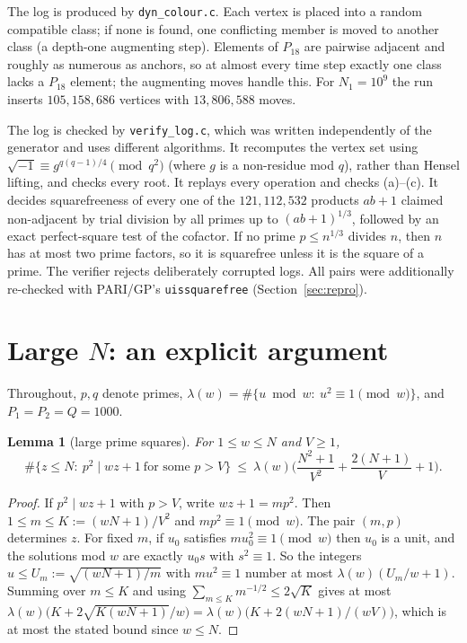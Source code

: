 \documentclass[11pt]{amsart}
\newtheorem{lemma}[theorem]{Lemma}
\theoremstyle{definition}
\theoremstyle{remark}
\begin{document}
The log is produced by \texttt{dyn\_colour.c}. Each vertex is placed into a random compatible class; if none
is found, one conflicting member is moved to another class (a depth-one augmenting step). Elements of $P_{18}$
are pairwise adjacent and roughly as numerous as anchors, so at almost every time step exactly one class
lacks a $P_{18}$ element; the augmenting moves handle this. For $N_1=10^9$ the run inserts $105{,}158{,}686$
vertices with $13{,}806{,}588$ moves.

The log is checked by \texttt{verify\_log.c}, which was written independently of the generator and uses
different algorithms. It recomputes the vertex set using $\sqrt{-1}\equiv g^{q(q-1)/4}\pmod{q^2}$ (where $g$ is
a non-residue mod $q$), rather than Hensel lifting, and checks every root. It replays every operation and
checks (a)--(c). It decides squarefreeness of every one of the $121{,}112{,}532$ products $ab+1$ claimed
non-adjacent by trial division by all primes up to $(ab+1)^{1/3}$, followed by an exact perfect-square test
of the cofactor. If no prime $p\le n^{1/3}$ divides $n$, then $n$ has at most two prime factors, so it is
squarefree unless it is the square of a prime. The verifier rejects deliberately corrupted logs. All pairs
were additionally re-checked with PARI/GP's \texttt{uissquarefree} (Section~\ref{sec:repro}).

\section{Large \texorpdfstring{$N$}{N}: an explicit argument}\label{sec:analytic}

Throughout, $p,q$ denote primes, $\lambda(w)=\#\{u\bmod w:\ u^2\equiv1\pmod w\}$, and $P_1=P_2=Q=1000$.

\begin{lemma}[large prime squares]\label{lem:LP}
For $1\le w\le N$ and $V\ge1$,
\[
\#\{z\le N:\ p^2\mid wz+1\ \text{for some } p>V\}\ \le\ \lambda(w)\Big(\frac{N^2+1}{V^2}+\frac{2(N+1)}{V}+1\Big).
\]
\end{lemma}
\begin{proof}
If $p^2\mid wz+1$ with $p>V$, write $wz+1=mp^2$. Then $1\le m\le K:=(wN+1)/V^2$ and $mp^2\equiv1\pmod w$. The
pair $(m,p)$ determines $z$. For fixed $m$, if $u_0$ satisfies $mu_0^2\equiv1\pmod w$ then $u_0$ is a unit, and
the solutions mod $w$ are exactly $u_0s$ with $s^2\equiv1$. So the integers $u\le U_m:=\sqrt{(wN+1)/m}$ with
$mu^2\equiv1$ number at most $\lambda(w)(U_m/w+1)$. Summing over $m\le K$ and using
$\sum_{m\le K}m^{-1/2}\le2\sqrt K$ gives at most
$\lambda(w)\big(K+2\sqrt{K(wN+1)}/w\big)=\lambda(w)\big(K+2(wN+1)/(wV)\big)$, which is at most the stated bound
since $w\le N$.
\end{proof}
\end{document}
